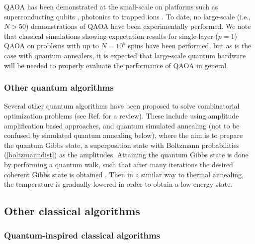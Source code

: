 \documentclass[fleqn,10pt]{wlscirep}
\begin{document}
QAOA has been demonstrated at the small-scale on platforms such as superconducting qubits \cite{harrigan2021quantum}, photonics \cite{qiang2018large} to trapped ions \cite{pagano2020quantum}.  To date, no large-scale (i.e.,  $ N > 50 $) demonstrations of QAOA have been experimentally performed. 
We note that classical simulations showing expectation results for single-layer ($p=1$) QAOA on problems with up to $N=10^5$ spins have been performed\cite{ozaeta2020expectation}, but as is the case with quantum annealers, it is expected that large-scale quantum hardware will be needed to properly evaluate the performance of QAOA in general.





\subsubsection*{Other quantum algorithms}

Several other quantum algorithms have been proposed to solve combinatorial optimization problems (see Ref. \cite{sanders2020compilation} for a review).  These include using amplitude amplification based approaches, and quantum simulated annealing (not to be confused by simulated quantum annealing below), where the aim is to prepare the quantum Gibbs state, a superposition state with Boltzmann probabilities (\ref{boltzmanndist}) as the amplitudes. Attaining the quantum Gibbs state is done by performing a quantum walk, such that after many iterations the desired coherent Gibbs state is obtained \cite{somma2008quantum,boixo2015fast,lemieux2020efficient}. Then in a similar way to thermal annealing, the temperature is gradually lowered in order to obtain a low-energy state.    



\subsection*{Other classical algorithms}


\subsubsection*{Quantum-inspired classical algorithms}
\end{document}
